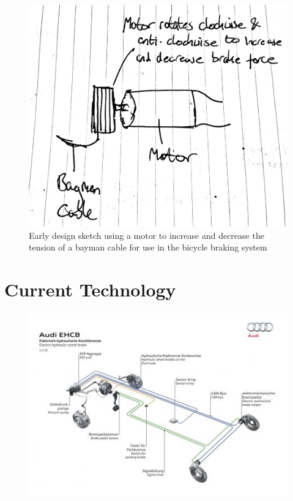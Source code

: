 \documentclass[a4paper]{report}
\begin{document}
\begin{figure}[h]
\centering
\includegraphics[scale=0.25]{figures/early_sketches/braking_system/motor_cable_tension}
\caption{Early design sketch using a motor to increase and decrease the tension of a bayman cable for use in the bicycle braking system}
\label{fig:early_motor_cable_tension}
\end{figure}

\section{Current Technology}
\label{app:brakes_current_technology}
\begin{figure}[h]
\centering
\includegraphics[scale=0.7]{figures/electronic_braking/audi_EHCB_1}
\caption{  \citep{audi_ehcb_1}}
\label{fig:audi_EHCB_1}
\end{figure}
\end{document}
